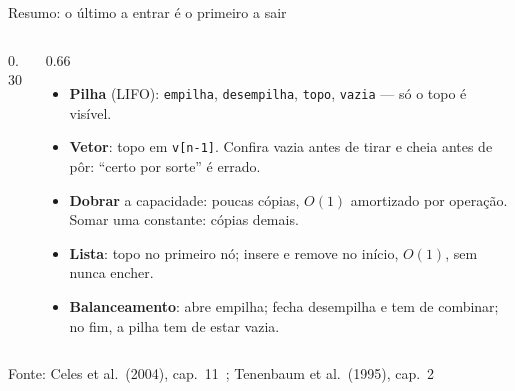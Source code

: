 \documentclass[aspectratio=169]{beamer}
\newcommand{\fonte}[1]{\vfill\hfill{\scriptsize\textcolor{UFSGray}{Fonte: #1}}}
\begin{document}
\begin{frame}{Resumo: o último a entrar é o primeiro a sair}
  \begin{columns}[T]
    \begin{column}{0.30\textwidth}
      \begin{center}
      \end{center}
    \end{column}
    \begin{column}{0.66\textwidth}
      \small
      \begin{itemize}
        \item \textbf{Pilha} (LIFO): \texttt{empilha}, \texttt{desempilha},
          \texttt{topo}, \texttt{vazia} --- só o topo é visível.
        \item \textbf{Vetor}: topo em \texttt{v[n-1]}. Confira vazia antes
          de tirar e cheia antes de pôr: ``certo por sorte'' é errado.
        \item \textbf{Dobrar} a capacidade: poucas cópias, $O(1)$ amortizado
          por operação. Somar uma constante: cópias demais.
        \item \textbf{Lista}: topo no primeiro nó; insere e remove no início,
          $O(1)$, sem nunca encher.
        \item \textbf{Balanceamento}: abre empilha; fecha desempilha e tem
          de combinar; no fim, a pilha tem de estar vazia.
      \end{itemize}
    \end{column}
  \end{columns}
  \fonte{Celes et al.\ (2004), cap.~11~\cite{celes2004introducao}; Tenenbaum et al.\ (1995), cap.~2~\cite{tenenbaum1995estruturas}}
\end{frame}
\end{document}
